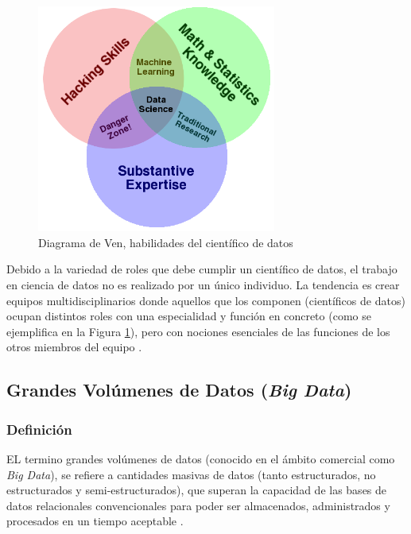  \begin{figure}[!htbp]
    \centering
    \includegraphics[width=0.7\textwidth]{Figuras/Data_Science_VD.png}
    \caption{Diagrama de Ven, habilidades del científico de datos}
    \label{fig:vennskills}
\end{figure}

 Debido a la variedad de roles que debe cumplir un científico de datos, el trabajo en ciencia de datos no es realizado por un único individuo. La tendencia es crear equipos multidisciplinarios donde aquellos que los componen (científicos de datos) ocupan distintos roles con una especialidad y función en concreto (como se ejemplifica en la Figura \ref{fig:vennskills}), pero con nociones esenciales de las funciones de los otros miembros del equipo \cite{5pellicer}.

\subsection{Grandes Volúmenes de Datos (\emph{Big Data})}

\subsubsection{Definición}

EL termino grandes volúmenes de datos (conocido en el ámbito comercial como \emph{Big Data}), se refiere a cantidades masivas de datos (tanto estructurados, no estructurados y semi-estructurados), que superan la capacidad de las bases de datos relacionales convencionales para poder ser almacenados, administrados y procesados en un tiempo  aceptable \cite{7sasinc}.

